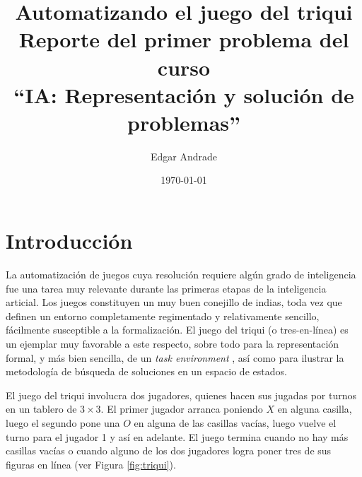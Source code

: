 \documentclass[11pt]{article}
\title{Automatizando el juego del triqui\\ Reporte del primer problema del curso\\ ``IA: Representación y solución de problemas''}
\author{Edgar Andrade}
\date{\today}
\begin{document}
\maketitle

\section{Introducción}

\noindent La automatización de juegos cuya resolución requiere algún grado de inteligencia fue una tarea muy relevante durante las primeras etapas de la inteligencia articial. Los juegos constituyen un muy buen conejillo de indias, toda vez que definen un entorno completamente regimentado y relativamente sencillo, fácilmente susceptible a la formalización. El juego del triqui (o tres-en-línea) es un ejemplar muy favorable a este respecto, sobre todo para la representación formal, y más bien sencilla, de un \emph{task environment} \cite[\S 3.1]{r_y_n2016}, así como para ilustrar la metodología de búsqueda de soluciones en un espacio de estados.

El juego del triqui involucra dos jugadores, quienes hacen sus jugadas por turnos en un tablero de $3\times 3$. El primer jugador arranca poniendo $X$ en alguna casilla, luego el segundo pone una $O$ en alguna de las casillas vacías, luego vuelve el turno para el jugador 1 y así en adelante. El juego termina cuando no hay más casillas vacías o cuando alguno de los dos jugadores logra poner tres de sus figuras en línea (ver Figura \ref{fig:triqui}).
\end{document}
